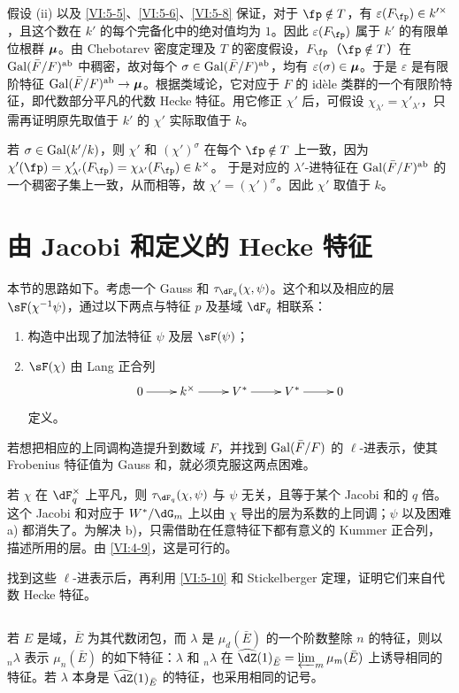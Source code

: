 假设 (ii) 以及 \ref{VI:5-5}、\ref{VI:5-6}、\ref{VI:5-8} 保证，对于 $\fp\notin T$，有 $\varepsilon(F_\fp)\in k'^\times$，且这个数在 $k'$ 的每个完备化中的绝对值均为 $1$。因此 $\varepsilon(F_\fp)$ 属于 $k'$ 的有限单位根群 ${\bm\mu}$。由 Chebotarev 密度定理及 $T$ 的密度假设，$F_\fp$（$\fp\notin T$）在 $\operatorname{Gal}(\bar F/F)^\text{ab}$ 中稠密，故对每个 $\sigma\in\operatorname{Gal}(\bar F/F)^\text{ab}$，均有 $\varepsilon(\sigma)\in{\bm\mu}$。于是 $\varepsilon$ 是有限阶特征 $\operatorname{Gal}(\bar F/F)^\text{ab}\to{\bm\mu}$。根据类域论，它对应于 $F$ 的 idèle 类群的一个有限阶特征，即代数部分平凡的代数 Hecke 特征。用它修正 $\chi'$ 后，可假设 $\chi_{\lambda'}=\chi'_{\lambda'}$，只需再证明原先取值于 $k'$ 的 $\chi'$ 实际取值于 $k$。

若 $\sigma\in\operatorname{Gal}(k'/k)$，则 $\chi'$ 和 $(\chi')^\sigma$ 在每个 $\fp\notin T$ 上一致，因为
$\chi'(\fp)=\chi'_{\lambda'}(F_\fp)=\chi_{\lambda'}(F_\fp)\in k^\times$。
于是对应的 $\lambda'$-进特征在 $\operatorname{Gal}(\bar F/F)^\text{ab}$ 的一个稠密子集上一致，从而相等，故 $\chi'=(\chi')^\sigma$。因此 $\chi'$ 取值于 $k$。

\section{由 Jacobi 和定义的 Hecke 特征}\label{VI:6}
本节的思路如下。考虑一个 Gauss 和 $\tau_{\dF_q}(\chi,\psi)$。这个和以及相应的层 $\sF(\chi^{-1}\psi)$，通过以下两点与特征 $p$ 及基域 $\dF_q$ 相联系：
\begin{enumerate}[\indent a)]
\item 构造中出现了加法特征 $\psi$ 及层 $\sF(\psi)$；
\item $\sF(\chi)$ 由 Lang 正合列
\[\xymatrix{0\ar[r]&k^\times\ar[r]&V^\ast\ar[r]&V^\ast\ar[r]&0}\]
定义。
\end{enumerate}
若想把相应的上同调构造提升到数域 $F$，并找到 $\operatorname{Gal}(\bar F/F)$ 的 $\ell$-进表示，使其 Frobenius 特征值为 Gauss 和，就必须克服这两点困难。

若 $\chi$ 在 $\dF_q^\times$ 上平凡，则 $\tau_{\dF_q}(\chi,\psi)$ 与 $\psi$ 无关，且等于某个 Jacobi 和的 $q$ 倍。这个 Jacobi 和对应于 $W^\ast/\dG_m$ 上以由 $\chi$ 导出的层为系数的上同调；$\psi$ 以及困难 a) 都消失了。为解决 b)，只需借助在任意特征下都有意义的 Kummer 正合列，描述所用的层。由 \ref{VI:4-9}，这是可行的。

找到这些 $\ell$-进表示后，再利用 \ref{VI:5-10} 和 Stickelberger 定理，证明它们来自代数 Hecke 特征。

\subsection{}\label{VI:6-1}
若 $E$ 是域，$\bar E$ 为其代数闭包，而 $\lambda$ 是 $\mu_d(\bar E)$ 的一个阶数整除 $n$ 的特征，则以 ${}_n\lambda$ 表示 $\mu_n(\bar E)$ 的如下特征：$\lambda$ 和 ${}_n\lambda$ 在
$\widehat\dZ(1)_{\bar E}=\varprojlim_m\mu_m(\bar E)$
上诱导相同的特征。若 $\lambda$ 本身是 $\widehat\dZ(1)_{\bar E}$ 的特征，也采用相同的记号。

